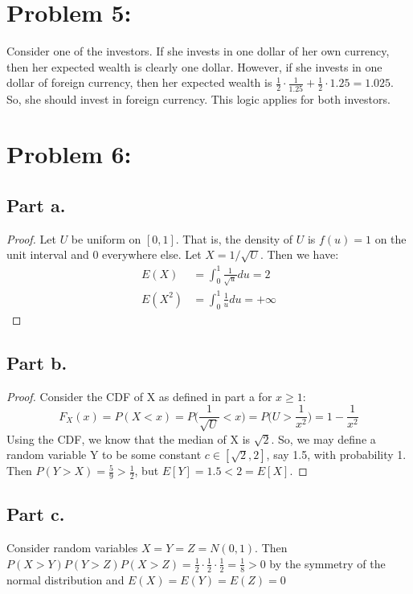 \documentclass{article}
\begin{document}
\section*{Problem 5:}

Consider one of the investors. If she invests in one dollar of her own currency, then her expected wealth is clearly one dollar. However, if she invests in one dollar of foreign currency, then her expected wealth is $\frac{1}{2} \cdot \frac{1}{1.25} + \frac{1}{2} \cdot 1.25 = 1.025$. So, she should invest in foreign currency. This logic applies for both investors.

\section*{Problem 6:}

\subsection*{Part a.}
\begin{proof}
Let $U$ be uniform on $[0, 1]$. That is, the density of $U$ is $f(u) = 1$ on the unit interval and 0 everywhere else. Let $X = 1 / \sqrt{U}$. Then we have:
\begin{align*}
E(X) &= \int_0^1 \frac{1}{\sqrt{u}} du = 2 \\
E(X^2) &= \int_0^1 \frac{1}{u} du = +\infty
\end{align*}
\end{proof}

\subsection*{Part b.}
\begin{proof}
Consider the CDF of X as defined in part a for $x \geq 1$:
$$
F_X(x) = P(X < x) = P\bigg(\frac{1}{\sqrt{U}} < x\bigg) = P\bigg(U > \frac{1}{x^2}\bigg) = 1 - \frac{1}{x^2}
$$
Using the CDF, we know that the median of X is $\sqrt{2}$. So, we may define a random variable Y to be some constant $c \in [\sqrt{2}, 2]$, say 1.5, with probability 1. Then $P(Y > X) = \frac{5}{9} > \frac{1}{2}$, but $E[Y] = 1.5 < 2 = E[X]$.
\end{proof}

\subsection*{Part c.}

Consider random variables $X = Y = Z = N(0, 1)$. Then $P(X > Y)P(Y > Z)P(X > Z) = \frac{1}{2} \cdot \frac{1}{2} \cdot \frac{1}{2} = \frac{1}{8} > 0$ by the symmetry of the normal distribution and $E(X) = E(Y) = E(Z) = 0$
\end{document}
